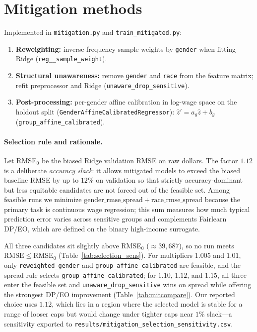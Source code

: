 \documentclass[sigconf,nonacm]{acmart}
\begin{document}
\section{Mitigation methods}

Implemented in \texttt{mitigation.py} and \texttt{train\_mitigated.py}:
\begin{enumerate}\itemsep2pt
\item \textbf{Reweighting:} inverse-frequency sample weights by \texttt{gender} when fitting Ridge (\texttt{reg\_\_sample\_weight}).
\item \textbf{Structural unawareness:} remove \texttt{gender} and \texttt{race} from the feature matrix; refit preprocessor and Ridge (\texttt{unaware\_drop\_sensitive}).
\item \textbf{Post-processing:} per-gender affine calibration in log-wage space on the holdout split (\texttt{GenderAffineCalibratedRegressor}): $\hat z' = a_g \hat z + b_g$ (\texttt{group\_affine\_calibrated}).
\end{enumerate}

\paragraph{Selection rule and rationale.}
Let RMSE$_0$ be the biased Ridge validation RMSE on raw dollars.
The factor $1.12$ is a deliberate \emph{accuracy slack}: it allows mitigated models to exceed the biased baseline RMSE by up to $12\%$ on validation so that strictly accuracy-dominant but less equitable candidates are not forced out of the feasible set.
Among feasible runs we minimize $\mathrm{gender\_rmse\_spread}+\mathrm{race\_rmse\_spread}$ because the primary task is continuous wage regression; this sum measures how much typical prediction error varies across sensitive groups and complements Fairlearn DP/EO, which are defined on the binary high-income surrogate.

All three candidates sit slightly above RMSE$_0$ ($\approx 39{,}687$), so no run meets $\mathrm{RMSE}\le \mathrm{RMSE}_0$ (Table~\ref{tab:selection_sens}).
For multipliers $1.005$ and $1.01$, only \texttt{reweighted\_gender} and \texttt{group\_affine\_calibrated} are feasible, and the spread rule selects \texttt{group\_affine\_calibrated}; for $1.10$, $1.12$, and $1.15$, all three enter the feasible set and \texttt{unaware\_drop\_sensitive} wins on spread while offering the strongest DP/EO improvement (Table~\ref{tab:mitcompare}).
Our reported choice uses $1.12$, which lies in a region where the selected model is stable for a range of looser caps but would change under tighter caps near $1\%$ slack---a sensitivity exported to \texttt{results/mitigation\_selection\_sensitivity.csv}.
\end{document}
